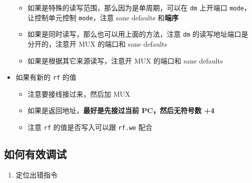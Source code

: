 \documentclass[12pt,AutoFakeBold]{article}
\providecommand{\tightlist}{%
  \setlength{\itemsep}{0pt}\setlength{\parskip}{0pt}}
\begin{document}
\begin{itemize}
  \begin{itemize}
  \tightlist
  \item
    如果是特殊的读写范围，那么因为是单周期，可以在 \texttt{dm} 上开端口
    \texttt{mode}，让控制单元控制 \texttt{mode}，注意 sane defaults
    和\textbf{端序}
  \item
    如果是同时读写，那么也可以用上面的方法，注意 \texttt{dm}
    的读写地址端口是分开的，注意开 MUX 的端口和 sane defaults
  \item
    如果是根据其它来源读写，注意开 MUX 的端口和 sane defaults
  \end{itemize}
\item
  如果有新的 \texttt{rf} 的值

  \begin{itemize}
  \tightlist
  \item
    注意要接线接过来，然后加 MUX
  \item
    如果是返回地址，\textbf{最好是先接过当前 PC，然后无符号数 +4}
  \item
    注意 \texttt{rf} 的值是否写入可以跟 \texttt{rf.we} 配合
  \end{itemize}
\end{itemize}

\hypertarget{ux5982ux4f55ux6709ux6548ux8c03ux8bd5}{%
\subsection{如何有效调试}\label{ux5982ux4f55ux6709ux6548ux8c03ux8bd5}}

\begin{enumerate}
\def\labelenumi{\arabic{enumi}.}
\tightlist
\item
  定位出错指令
\end{enumerate}
\end{document}
